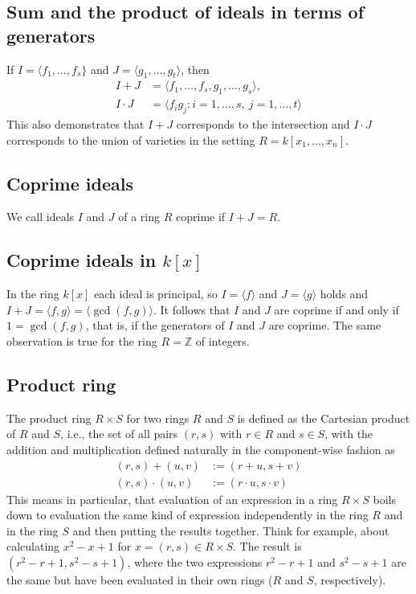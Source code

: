 \documentclass[11pt,a4paper]{amsart}
\newcommand{\Z}{{\mathbb{Z}}}
\begin{document}
\subsection{Sum and the product of ideals in terms of generators} 
If $I = \langle f_1,\ldots, f_s\}$ and $J = \langle g_1,\ldots, g_t\rangle$, 
then 
\begin{align*} 
	I +J & =  \langle f_1 ,\ldots, f_s, g_1,\ldots, g_s \rangle, 
	\\ I \cdot J & = \langle f_i g_j \colon i=1,\ldots,s, \ j =1,\ldots,t\rangle 
\end{align*} 
This also demonstrates that $I+J$ corresponds to the intersection and $I \cdot J$ corresponds to the union of varieties in the setting $R = k[x_1,\ldots,x_n]$. 

\subsection{Coprime ideals} We call ideals $I$ and $J$ of a ring $R$ coprime if $I +  J  = R$. 

\subsection{Coprime ideals in $k[x]$} In the ring $k[x]$ each ideal is principal, so $I = \langle f \rangle$ and $J = \langle g \rangle$ holds and $I + J = \langle f, g \rangle = \langle \gcd(f,g) \rangle$. It follows that $I$ and $J$ are coprime if and only if $1= \gcd(f,g)$, that is, if the generators of $I$ and $J$ are coprime. The same observation is true for the ring $R= \Z$ of integers. 

\subsection{Product ring} The product ring $R \times S$ for two rings $R$ and $S$ is defined as the Cartesian product of $R$ and $S$, i.e., the set of all pairs $(r,s)$ with $r \in R$ and $s \in S$, with the addition and multiplication defined naturally in the component-wise fashion as 
\begin{align*} 
	(r,s) + (u,v) & := (r+u,s+v)
	\\ 
	(r,s) \cdot (u,v) & := (r \cdot u, s \cdot v)
\end{align*} 
This means in particular, that evaluation of an expression in a ring $R \times S$ boils down to evaluation the same kind of expression independently in the ring $R$ and in the ring $S$ and then putting the results together. Think for example, about calculating $x^2 - x + 1$ for $x= (r,s) \in R \times S$. The result is $(r^2 - r + 1, s^2 - s+1)$, where the two expressions $r^2 - r+1$ and $s^2 - s+1$ are the same but have been evaluated in their own rings ($R$ and $S$, respectively). 
\end{document}
